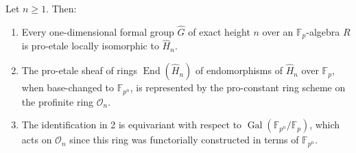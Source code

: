 \documentclass[10pt,a4paper]{amsart}
\newcommand{\on}{\operatorname}
\begin{document}
\begin{theorem}\label{heightn}
Let $n\geq 1$.  Then:
\begin{enumerate}
\item Every one-dimensional formal group $\widehat{G}$ of exact height $n$ over an $\mathbb{F}_p$-algebra $R$ is pro-etale locally isomorphic to $\widehat{H}_n$.
\item The pro-etale sheaf of rings $\on{End}(\widehat{H}_n)$ of endomorphisms of $\widehat{H}_n$ over $\mathbb{F}_p$, when base-changed to $\mathbb{F}_{p^n}$, is represented by the pro-constant ring scheme on the profinite ring $\mathcal{O}_n$.
\item The identification in 2 is equivariant with respect to $\on{Gal}(\mathbb{F}_{p^n}/\mathbb{F}_p)$, which acts on $\mathcal{O}_n$ since this ring was functorially constructed in terms of $\mathbb{F}_{p^n}$.
\end{enumerate}
\end{theorem}
\end{document}
